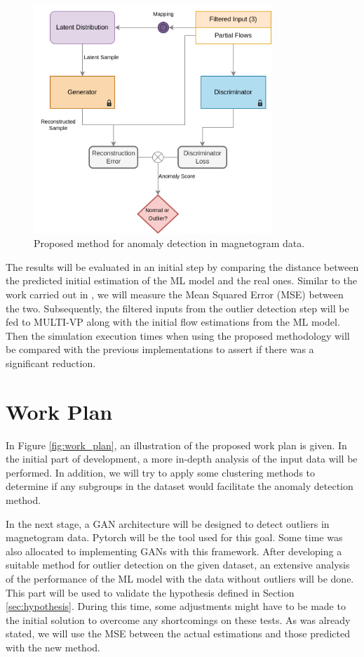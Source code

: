 \begin{figure}[ht]
\centering
\includegraphics[width=0.8\textwidth]{figures/proposed_gan_arch.png}
\caption{Proposed method for anomaly detection in magnetogram data.}
\label{fig:proposed_gan_arch}
\end{figure}


The results will be evaluated in an initial step by comparing the distance between the predicted initial estimation of the ML model and the real ones. Similar to the work carried out in \cite{barros_InitialConditionEstimation_}, we will measure the Mean Squared Error (MSE) between the two. Subsequently, the filtered inputs from the outlier detection step will be fed to MULTI-VP along with the initial flow estimations from the ML model. Then the simulation execution times when using the proposed methodology will be compared with the previous implementations to assert if there was a significant reduction.

\section{Work Plan}\label{sec:work_plan}
In Figure \ref{fig:work_plan}, an illustration of the proposed work plan is given. In the initial part of development, a more in-depth analysis of the input data will be performed. In addition, we will try to apply some clustering methods to determine if any subgroups in the dataset would facilitate the anomaly detection method.

In the next stage, a GAN architecture will be designed to detect outliers in magnetogram data. Pytorch \cite{NEURIPS2019_9015} will be the tool used for this goal. Some time was also allocated to implementing GANs with this framework. After developing a suitable method for outlier detection on the given dataset, an extensive analysis of the performance of the ML model with the data without outliers will be done. This part will be used to validate the hypothesis defined in Section \ref{sec:hypothesis}. During this time, some adjustments might have to be made to the initial solution to overcome any shortcomings on these tests. As was already stated, we will use the MSE between the actual estimations and those predicted with the new method. 

